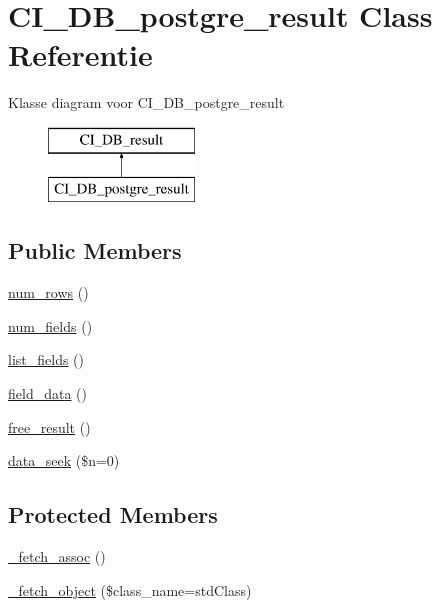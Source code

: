 \hypertarget{class_c_i___d_b__postgre__result}{}\section{C\+I\+\_\+\+D\+B\+\_\+postgre\+\_\+result Class Referentie}
\label{class_c_i___d_b__postgre__result}
Klasse diagram voor C\+I\+\_\+\+D\+B\+\_\+postgre\+\_\+result\begin{figure}[H]
\begin{center}
\leavevmode
\includegraphics[height=2.000000cm]{class_c_i___d_b__postgre__result}
\end{center}
\end{figure}
\subsection*{Public Members}
\begin{DoxyCompactItemize}
\item 
\mbox{\hyperlink{class_c_i___d_b__postgre__result_a218657c303ee499b97710ab0cd2f5d6e}{num\+\_\+rows}} ()
\item 
\mbox{\hyperlink{class_c_i___d_b__postgre__result_af831bf363e4d7d661a717a4932af449d}{num\+\_\+fields}} ()
\item 
\mbox{\hyperlink{class_c_i___d_b__postgre__result_a50b54eb4ea7cfd039740f532988ea776}{list\+\_\+fields}} ()
\item 
\mbox{\hyperlink{class_c_i___d_b__postgre__result_a84bffd65e53902ade1591716749a33e3}{field\+\_\+data}} ()
\item 
\mbox{\hyperlink{class_c_i___d_b__postgre__result_aad2d98d6beb3d6095405356c6107b473}{free\+\_\+result}} ()
\item 
\mbox{\hyperlink{class_c_i___d_b__postgre__result_a8255ae91816e4206e29eb7581c5af0f1}{data\+\_\+seek}} (\$n=0)
\end{DoxyCompactItemize}
\subsection*{Protected Members}
\begin{DoxyCompactItemize}
\item 
\mbox{\hyperlink{class_c_i___d_b__postgre__result_a43a9a92817f1334a1c10752ec44275a0}{\+\_\+fetch\+\_\+assoc}} ()
\item 
\mbox{\hyperlink{class_c_i___d_b__postgre__result_a60806be6a9c2488820813c2a7f4fef71}{\+\_\+fetch\+\_\+object}} (\$class\+\_\+name=\textquotesingle{}std\+Class\textquotesingle{})
\end{DoxyCompactItemize}
